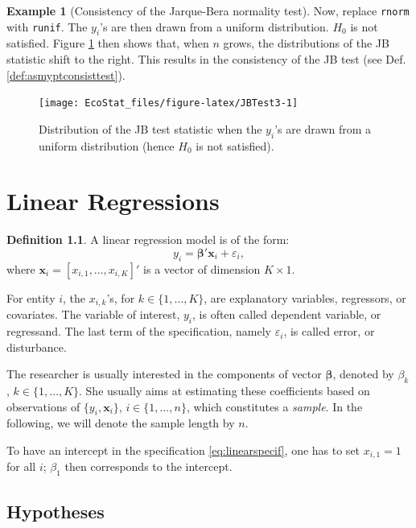 \documentclass[
  12pt,
]{book}
\theoremstyle{definition}
\newtheorem{definition}{Definition}[chapter]
\theoremstyle{definition}
\newtheorem{example}{Example}[chapter]
\theoremstyle{definition}
\theoremstyle{definition}
\theoremstyle{remark}
\begin{document}
\begin{example}[Consistency of the Jarque-Bera normality test]
Now, replace \texttt{rnorm} with \texttt{runif}. The \(y_i\)'s are then drawn from a uniform distribution. \(H_0\) is not satisfied. Figure \ref{fig:JBTest3} then shows that, when \(n\) grows, the distributions of the JB statistic shift to the right. This results in the consistency of the JB test (see Def. \ref{def:asmyptconsisttest}).

\begin{figure}
\texttt{[image: EcoStat\_files/figure-latex/JBTest3-1]} \caption{Distribution of the JB test statistic when the $y_i$'s are drawn from a uniform distribution (hence $H_0$ is not satisfied).}\label{fig:JBTest3}
\end{figure}

\end{example}

\hypertarget{ChapterLS}{%
\chapter{Linear Regressions}\label{ChapterLS}}

\begin{definition}
\protect\hypertarget{def:essai}{}\label{def:essai}A linear regression model is of the form:
\begin{equation}
y_i = \boldsymbol\beta'\mathbf{x}_{i} + \varepsilon_i,\label{eq:linearspecif}
\end{equation}
where \(\mathbf{x}_{i}=[x_{i,1},\dots,x_{i,K}]'\) is a vector of dimension \(K \times 1\).
\end{definition}

For entity \(i\), the \(x_{i,k}\)'s, for \(k \in \{1,\dots,K\}\), are explanatory variables, regressors, or covariates. The variable of interest, \(y_i\), is often called dependent variable, or regressand. The last term of the specification, namely \(\varepsilon_i\), is called error, or disturbance.

The researcher is usually interested in the components of vector \(\boldsymbol\beta\), denoted by \(\beta_k\), \(k \in \{1,\dots,K\}\). She usually aims at estimating these coefficients based on observations of \(\{y_i,\mathbf{x}_{i}\}\), \(i \in \{1,\dots,n\}\), which constitutes a \emph{sample}. In the following, we will denote the sample length by \(n\).

To have an intercept in the specification \eqref{eq:linearspecif}, one has to set \(x_{i,1}=1\) for all \(i\); \(\beta_1\) then corresponds to the intercept.

\hypertarget{linearHyp}{%
\section{Hypotheses}\label{linearHyp}}
\end{document}
